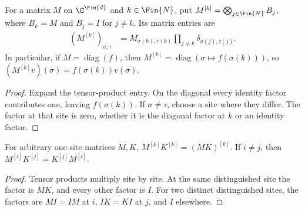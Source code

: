\begin{definition}
    \label{def:mpo_joint_site_matrix}
    For a matrix $M$ on $\C^{\Fin{d}}$ and $k\in\Fin{N}$, put
    $M^{[k]}=\bigotimes_{j\in\Fin{N}}B_j$, where $B_k=M$ and
    $B_j=I$ for $j\ne k$. Its matrix entries are
    \begin{align}
        (M^{[k]})_{\sigma,\tau}
         & =M_{\sigma(k),\tau(k)}
        \prod_{j\ne k}\delta_{\sigma(j),\tau(j)}.
        \label{eq:mpo_joint_site_entries}
    \end{align}
    In particular, if $M=\operatorname{diag}(f)$, then
    $M^{[k]}=\operatorname{diag}(\sigma\mapsto f(\sigma(k)))$, so
    $(M^{[k]}v)(\sigma)=f(\sigma(k))v(\sigma)$.
\end{definition}
\begin{proof}
    Expand the tensor-product entry. On the diagonal every identity
    factor contributes one, leaving $f(\sigma(k))$. If $\sigma\ne\tau$,
    choose a site where they differ. The factor at that site is zero,
    whether it is the diagonal factor at $k$ or an identity factor.
\end{proof}

\begin{theorem}
    \label{thm:mpo_joint_site_matrix_products}
    For arbitrary one-site matrices $M,K$,
    $M^{[k]}K^{[k]}=(MK)^{[k]}$.
    If $i\ne j$, then $M^{[i]}K^{[j]}=K^{[j]}M^{[i]}$.
\end{theorem}
\begin{proof}
    Tensor products multiply site by site. At the same distinguished
    site the factor is $MK$, and every other factor is $I$.
    For two distinct distinguished sites, the factors are $M I=I M$
    at $i$, $I K=K I$ at $j$, and $I$ elsewhere.
\end{proof}

